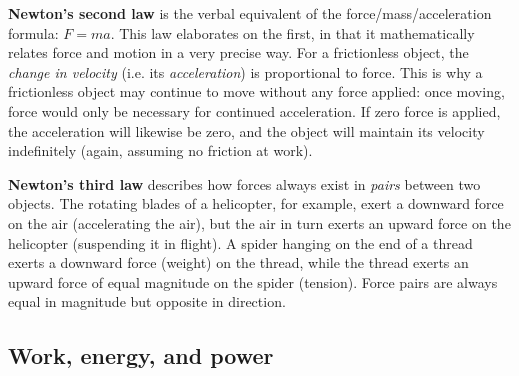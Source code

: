 \vskip 10pt

\textbf{Newton's second law} is the verbal equivalent of the force/mass/acceleration formula: $F = ma$.  This law elaborates on the first, in that it mathematically relates force and motion in a very precise way.  For a frictionless object, the \textit{change in velocity} (i.e. its \textit{acceleration}) is proportional to force.  This is why a frictionless object may continue to move without any force applied: once moving, force would only be necessary for continued acceleration.  If zero force is applied, the acceleration will likewise be zero, and the object will maintain its velocity indefinitely (again, assuming no friction at work). 

\vskip 10pt

\textbf{Newton's third law} describes how forces always exist in \textit{pairs} between two objects.  The rotating blades of a helicopter, for example, exert a downward force on the air (accelerating the air), but the air in turn exerts an upward force on the helicopter (suspending it in flight).  A spider hanging on the end of a thread exerts a downward force (weight) on the thread, while the thread exerts an upward force of equal magnitude on the spider (tension).  Force pairs are always equal in magnitude but opposite in direction.  











\filbreak
\subsection{Work, energy, and power}

